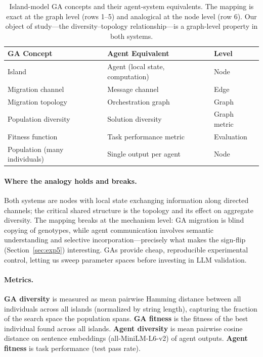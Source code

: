 \documentclass[runningheads]{llncs}
\begin{document}
\begin{table}[t]
\centering
\caption{Island-model GA concepts and their agent-system equivalents.
The mapping is exact at the graph level (rows 1--5) and analogical at
the node level (row 6). Our object of study---the
diversity--topology relationship---is a graph-level property in both
systems.}
\label{tab:mapping}
\begin{tabular}{@{}lll@{}}
\toprule
\textbf{GA Concept} & \textbf{Agent Equivalent} & \textbf{Level} \\
\midrule
Island & Agent (local state, computation) & Node \\
Migration channel & Message channel & Edge \\
Migration topology & Orchestration graph & Graph \\
Population diversity & Solution diversity & Graph metric \\
Fitness function & Task performance metric & Evaluation \\
\midrule
Population (many individuals) & Single output per agent & Node \\
\bottomrule
\end{tabular}
\end{table}

\paragraph{Where the analogy holds and breaks.}
Both systems are nodes with local state exchanging information along
directed channels; the critical shared structure is the topology and
its effect on aggregate diversity. The mapping breaks at the mechanism
level: GA migration is blind copying of genotypes, while agent
communication involves semantic understanding and selective
incorporation---precisely what makes the sign-flip (Section~\ref{sec:exp5})
interesting. GAs provide cheap, reproducible experimental control,
letting us sweep parameter spaces before investing in LLM validation.

\paragraph{Metrics.}
\textbf{GA diversity} is measured as mean pairwise Hamming distance
between all individuals across all islands (normalized by string
length), capturing the fraction of the search space the population
spans. \textbf{GA fitness} is the fitness of the best individual found
across all islands. \textbf{Agent diversity} is mean pairwise cosine
distance on sentence embeddings (all-MiniLM-L6-v2) of agent outputs.
\textbf{Agent fitness} is task performance (test pass rate).
\end{document}
